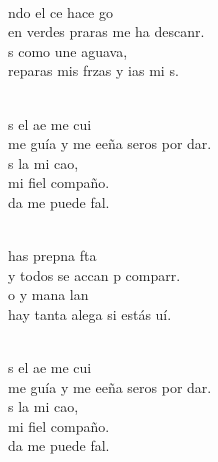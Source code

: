 \begin{cancion}%
	   \\
	ndo el ce hace go\\
	en verdes praras me ha descanr.\\
	s como une aguava,\\
	reparas mis frzas y ias mi s.\\\jump\\
	\begin{chorus}%
	s el ae me cui\\
	me guía y me eeña seros por dar.\\
	s la mi cao, \\
	mi fiel compaño.\\
	da me puede fal.   \\
	\end{chorus}%
	\jump\\
	has prepna fta\\
	y todos se accan p comparr.\\
	o y mana lan\\
	hay tanta alega si  estás uí. \\\jump\\
	\begin{chorus}%
	s el ae me cui\\
	me guía y me eeña seros por dar.\\
	s la mi cao, \\
	mi fiel compaño.\\
	da me puede fal.   \\

\end{chorus}
\end{cancion}
